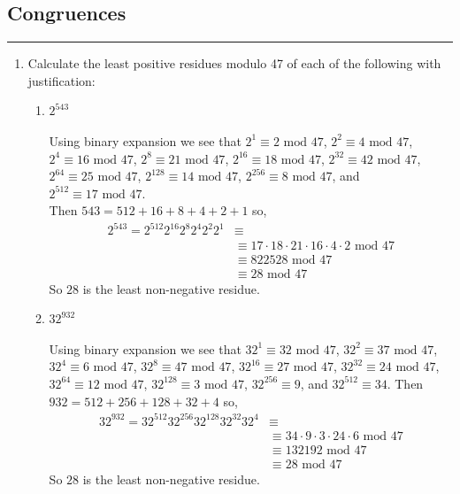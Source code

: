 \documentclass[class=article, crop=false]{standalone}
\begin{document}
\subsection{Congruences}
\hfill {}
\rule{\textwidth}{1pt}
\begin{enumerate}
\item
  Calculate the least positive residues modulo 47 of each of
  the following with justification:
  \begin{enumerate}
  \item $2^{543}$ \\\\
  Using binary expansion we see that $2^1 \equiv 2\mbox{ mod } 47$, $2^2 \equiv 4\mbox{ mod } 47$,
  $2^4 \equiv 16\mbox{ mod } 47$, $2^8 \equiv 21\mbox{ mod } 47$, $2^{16} \equiv 18\mbox{ mod } 47$, $2^{32} \equiv 42\mbox{ mod } 47$,
  $2^{64}\equiv 25\mbox{ mod } 47$, $2^{128}\equiv 14\mbox{ mod } 47$, $2^{256}\equiv 8\mbox{ mod } 47$, and $2^{512}\equiv 17\mbox{ mod } 47$.\\
  Then $543 = 512 + 16 + 8 + 4 + 2 + 1$ so,
  \begin{align*}
	2^{543} = 2^{512}2^{16}2^{8}2^{4}2^{2}2^{1} &\equiv \\
	&\equiv 17\cdot18\cdot 21\cdot 16\cdot 4\cdot 2 \mbox{ mod } 47 \\
	&\equiv 822528 \mbox{ mod } 47 \\
	&\equiv 28 \mbox{ mod } 47
  \end{align*}
  So $28$ is the least non-negative residue.
  
  \item $32^{932}$ \\\\
  Using binary expansion we see that $32^1 \equiv 32\mbox{ mod }47$,
  $32^2 \equiv 37\mbox{ mod }47$, $32^4\equiv 6\mbox{ mod }47$, $32^8\equiv 47\mbox{ mod }47$,
  $32^{16}\equiv 27\mbox{ mod }47$, $32^{32}\equiv 24\mbox{ mod }47$, $32^{64}\equiv 12\mbox{ mod }47$,
  $32^{128}\equiv 3\mbox{ mod }47$, $32^{256}\equiv 9$, and $32^{512}\equiv 34$.
  Then $932 = 512 + 256 + 128 + 32 + 4$ so,
  \begin{align*}
	32^{932} = 32^{512}32^{256}32^{128}32^{32}32^4 &\equiv \\
	&\equiv 34\cdot 9\cdot 3\cdot 24\cdot 6 \mbox{ mod }47 \\
	&\equiv 132192 \mbox{ mod }47 \\
	&\equiv 28 \mbox{ mod }47
  \end{align*}
  So $28$ is the least non-negative residue.
  

\end{enumerate}
\end{enumerate}
\end{document}
